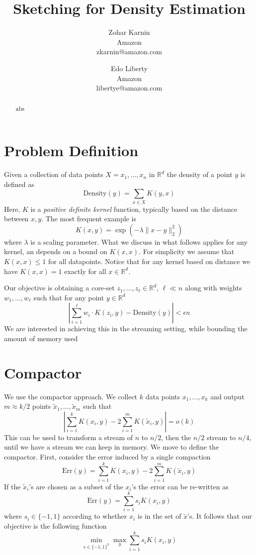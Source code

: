 \documentclass{article} %
\title{Sketching for Density Estimation}
\date{\nonumber}
\author{
Zohar Karnin\\Amazon\\zkarnin@amazon.com
\and
Edo Liberty\\Amazon\\libertye@amazon.com
}
\newcommand{\R}{\mathbb{R}}
\newcommand{\D}{\text{Density}}
\newcommand{\eps}{\epsilon}
\begin{document}
\maketitle

\begin{abstract}
abs\end{abstract}

\section{Problem Definition}
Given a collection of data points $X = x_1,\ldots, x_n$ in $\R^d$ the density of a point $y$ is defined as 
$$ \D(y) = \sum_{x \in X} K(y,x) $$
Here, $K$ is a \emph{positive definite kernel} function, typically based on the distance between $x,y$. The most frequent example is 
$$ K(x,y) = \exp(-\lambda \|x-y\|_2^2) $$
where $\lambda$ is a scaling parameter. What we discuss in what follows applies for any kernel, an depends on a bound on $K(x,x)$. For simplicity we assume that $K(x,x) \leq 1$ for all datapoints. Notice that for any kernel based on distance we have $K(x,x)=1$ exactly for all $x \in \R^d$.

Our objective is obtaining a core-set $z_1,\ldots, z_\ell \in \R^d$, $\ell \ll n$ along with weights $w_1,\ldots, w_\ell$ such that for any point $y \in \R^d$
$$ \left| \sum_{i=1}^\ell w_i \cdot K(z_i, y) - \D(y) \right| < \eps n $$
We are interested in achieving this in the streaming setting, while bounding the amount of memory used

\section{Compactor}
We use the compactor approach. We collect $k$ data points $x_1,\ldots, x_k$ and output $m \approx k/2$ points $\tilde{x}_1,\ldots, \tilde{x}_m$ such that 
$$ \left| \sum_{i =1}^k K(x_i,y) - 2\sum_{i=1}^m K(\tilde{x}_i, y) \right| = o(k)$$
This can be used to transform a stream of $n$ to $n/2$, then the $n/2$ stream to $n/4$, until we have a stream we can keep in memory. We move to define the compactor. First, consider the error induced by a single compaction
$$ \text{Err}(y) = \sum_{i =1}^k K(x_i,y) - 2\sum_{i=1}^m K(\tilde{x}_i, y) $$
If the $\tilde{x}_i$'s are chosen as a subset of the $x_i$'s the error can be re-written as
$$ \text{Err}(y) = \sum_{i=1}^k s_i K(x_i,y)  $$
where $s_i \in \{-1, 1\}$ according to whether $x_i$ is in the set of $\tilde{x}$'s. It follows that our objective is the following function
$$ \min_{s \in \{-1,1\}^k} \max_y \sum_{i=1}^k s_i K(x_i,y) $$
\end{document}
